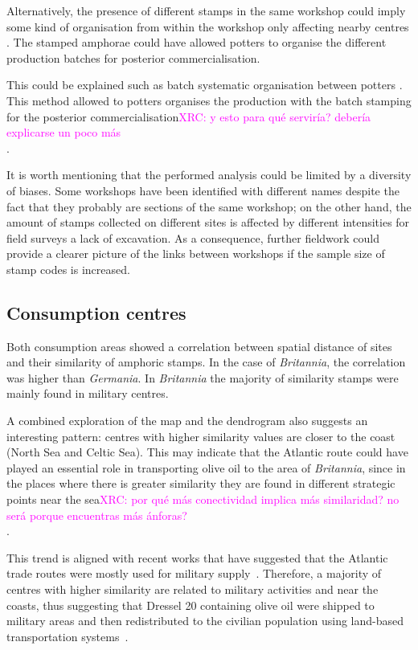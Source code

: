 \documentclass[review]{elsarticle}
\newcommand{\memo}[2]{\textcolor{#1}{#2}}
\newcommand{\xavi}[1]{\memo{magenta}{XRC: #1\\}}
\begin{document}
Alternatively, the presence of different stamps in the same workshop could imply some kind of organisation from within the workshop only affecting nearby centres \citep{juanmorostesis}. The stamped amphorae could have allowed potters to organise the different production batches for posterior commercialisation.


This could be explained such as batch systematic organisation between potters \citep{juanmorostesis}. This method allowed to potters organises the production with the batch stamping for the posterior commercialisation\xavi{y esto para qué serviría? debería explicarse un poco más}.


It is worth mentioning that the performed analysis could be limited by a diversity of biases. Some workshops have been identified with different names despite the fact that they probably are sections of the same workshop; on the other hand, the amount of stamps collected on different sites is affected by different intensities for field surveys a lack of excavation. As a consequence, further fieldwork could provide a clearer picture of the links between workshops if the sample size of stamp codes is increased.

\subsection{Consumption centres}

Both consumption areas showed a correlation between spatial distance of sites and their similarity of amphoric stamps. In the case of  \textit{Britannia}, the correlation was higher than \textit{Germania}. In \textit{Britannia} the majority of similarity stamps were mainly found in military centres.  

A combined exploration of the map and the dendrogram also suggests an interesting pattern: centres with higher similarity values are closer to the coast (North Sea and Celtic Sea). This may indicate that the Atlantic route could have played an essential role in transporting olive oil to the area of \textit{Britannia}, since in the places where there is greater similarity they are found in different strategic points near the sea\xavi{por qué más conectividad implica más similaridad? no será porque encuentras más ánforas?}.

This trend is aligned with recent works that have suggested that the Atlantic trade routes were mostly used for military supply~\citep{remesal_annona_1986,remesal_provincial_2008,carreras_atlantic_2012,morillo_hispania_2016,rubio-campillo_provincias_2018}. Therefore, a majority of centres with higher similarity are related to military activities and near the coasts, thus suggesting that Dressel 20 containing olive oil were shipped to military areas and then redistributed to the civilian population using land-based transportation systems~\citep{carreras_britannia_1998,ayllon_olive_2018}.
\end{document}
